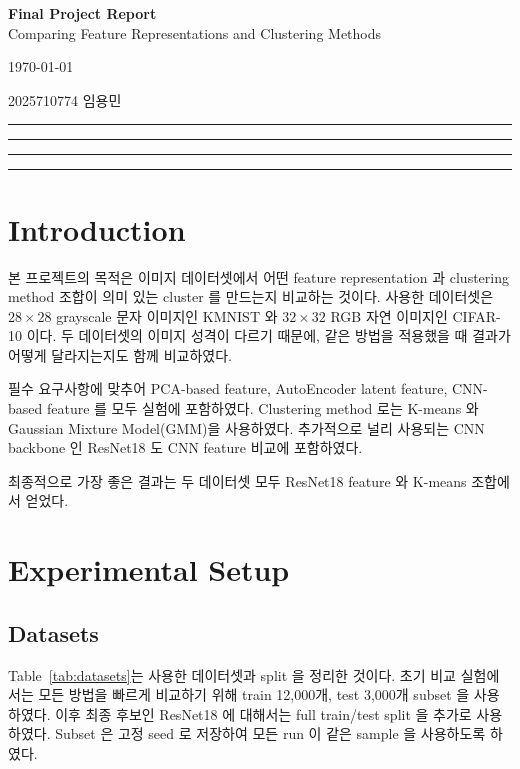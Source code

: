 \documentclass[11pt]{article}
\begin{document}
\begin{center}
    {\bf \Huge Final Project Report}\\
    \vspace{0.05in}
    {\Large Comparing Feature Representations and Clustering Methods}\\
    \parbox[t][0.4in]{3.1in}{\begin{flushleft}
        \today
    \end{flushleft}}
    \parbox[t][0.4in]{3.1in}{\begin{flushright}
        2025710774 임용민
    \end{flushright}}
    \hrule \hrule \hrule \hrule
\end{center}

\section{Introduction}

본 프로젝트의 목적은 이미지 데이터셋에서 어떤 feature representation 과 clustering method 조합이 의미 있는 cluster 를 만드는지 비교하는 것이다.
사용한 데이터셋은 \(28\times28\) grayscale 문자 이미지인 KMNIST 와 \(32\times32\) RGB 자연 이미지인 CIFAR-10 이다.
두 데이터셋의 이미지 성격이 다르기 때문에, 같은 방법을 적용했을 때 결과가 어떻게 달라지는지도 함께 비교하였다.

필수 요구사항에 맞추어 PCA-based feature, AutoEncoder latent feature, CNN-based feature 를 모두 실험에 포함하였다.
Clustering method 로는 K-means 와 Gaussian Mixture Model(GMM)을 사용하였다.
추가적으로 널리 사용되는 CNN backbone 인 ResNet18 도 CNN feature 비교에 포함하였다.

최종적으로 가장 좋은 결과는 두 데이터셋 모두 ResNet18 feature 와 K-means 조합에서 얻었다.

\section{Experimental Setup}

\subsection{Datasets}

Table~\ref{tab:datasets}는 사용한 데이터셋과 split 을 정리한 것이다.
초기 비교 실험에서는 모든 방법을 빠르게 비교하기 위해 train 12,000개, test 3,000개 subset 을 사용하였다.
이후 최종 후보인 ResNet18 에 대해서는 full train/test split 을 추가로 사용하였다.
Subset 은 고정 seed 로 저장하여 모든 run 이 같은 sample 을 사용하도록 하였다.
\end{document}
